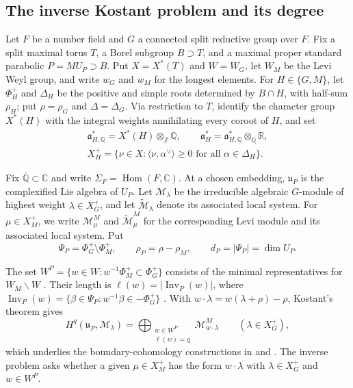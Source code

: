 \documentclass[12pt]{amsart}
\numberwithin{equation}{section}
\theoremstyle{plain}
\theoremstyle{definition}
\theoremstyle{remark}
\DeclareMathOperator{\Inv}{Inv}
\newcommand{\cM}{\mathcal M}
\newcommand{\tcM}{\widetilde{\mathcal M}}
\begin{document}
\subsection{The inverse Kostant problem and its degree}
Let $F$ be a number field and $G$ a connected split reductive group over $F$. Fix a split maximal torus $T$, a Borel subgroup $B\supset T$, and a maximal proper standard parabolic $P=MU_P\supset B$. Put $X=X^*(T)$ and $W=W_G$, let $W_M$ be the Levi Weyl group, and write $w_G$ and $w_M$ for the longest elements. For $H\in\{G,M\}$, let $\Phi_H^+$ and $\Delta_H$ be the positive and simple roots determined by $B\cap H$, with half-sum $\rho_H$; put $\rho=\rho_G$ and $\Delta=\Delta_G$. Via restriction to $T$, identify the character group $X^*(H)$ with the integral weights annihilating every coroot of $H$, and set
\begin{align*}
 \mathfrak a_{H,\mathbb Q}^*=X^*(H)\otimes_{\mathbb Z}\mathbb Q,
 \qquad
 \mathfrak a_H^*=\mathfrak a_{H,\mathbb Q}^*\otimes_{\mathbb Q}\mathbb R,
 \\
 X_H^+=\{\nu\in X:\langle\nu,\alpha^\vee\rangle\ge0
                         \text{ for all }\alpha\in\Delta_H\}.   
\end{align*}
 
Fix $\overline{\mathbb Q}\subset\mathbb C$ and write $\Sigma_F=\operatorname{Hom}(F,\mathbb C)$. At a chosen embedding, $\mathfrak u_P$ is the complexified Lie algebra of $U_P$. Let $\cM_\lambda$ be the irreducible algebraic $G$-module of highest weight $\lambda\in X_G^+$, and let $\tcM_\lambda$ denote its associated local system. For $\mu\in X_M^+$, we write $\cM_\mu^M$ and $\tcM_\mu^M$ for the corresponding Levi module and its associated local system. Put
\[
 \Psi_P=\Phi_G^+\setminus\Phi_M^+,
 \qquad \rho_P=\rho-\rho_M,
 \qquad d_P=|\Psi_P|=\dim U_P.
 \]
 
The set $W^P=\{w\in W:w^{-1}\Phi_M^+\subset\Phi_G^+\}$ consists of the minimal representatives for $W_M\backslash W$ \cite[\S6.2.5]{HarderBook}. Their length is $\ell(w)=|\Inv_P(w)|$, where $\Inv_P(w)=\{\beta\in\Psi_P:w^{-1}\beta\in-\Phi_G^+\}$ \cite{Humphreys1990}. With $w\cdot\lambda=w(\lambda+\rho)-\rho$, Kostant's theorem \cite{Kostant} gives
\begin{equation}\label{eq:Kostant}
 H^q(\mathfrak u_P,\cM_\lambda)
   =\bigoplus_{\substack{w\in W^P\\\ell(w)=q}}
       \cM^M_{w\cdot\lambda}
 \qquad(\lambda\in X_G^+),
\end{equation}
which underlies the boundary-cohomology constructions in \cite[\S6.2.5]{HarderBook} and \cite{Schwermer1983}. The inverse problem asks whether a given $\mu\in X_M^+$ has the form $w\cdot\lambda$ with $\lambda\in X_G^+$ and $w\in W^P$.
\end{document}
